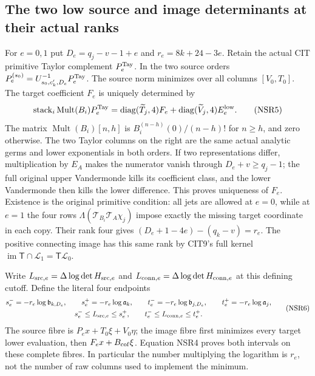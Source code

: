 \documentclass[11pt,a4paper]{article}
\begin{document}
\subsection{The two low source and image determinants at their actual ranks}
For $e=0,1$ put $D_e=q_j-v-1+e$ and
$r_e=8k+24-3e$. Retain the actual CIT primitive Taylor
complement $P_e^{\rm Tay}$. In the two source orders
$P_e^{(s_0)}=U_{s_0,c'_k,D_e}^{-1}P_e^{\rm Tay}$.
The source norm minimizes over all columns $[V_0,T_0]$.
The target coefficient $F_e$ is uniquely determined by
\[
 \operatorname{stack}_i\operatorname{Mult}(B_i)P_e^{\rm Tay}
  =\operatorname{diag}(\widetilde T_j,4)F_e
       +\operatorname{diag}(\widetilde V_j,4)E_e^{\rm low}.
 \tag{NSR5}
\]
The matrix $\operatorname{Mult}(B_i)[n,h]$ is
$B_i^{(n-h)}(0)/(n-h)!$ for $n\ge h$, and zero otherwise.
The two Taylor columns on the right are the same actual
analytic germs and lower exponentials in both orders.
If two representations differ, multiplication by $E_A$
makes the numerator vanish through $D_e+v\ge q_j-1$;
the full original upper Vandermonde kills its coefficient
class, and the lower Vandermonde then kills the lower
difference. This proves uniqueness of $F_e$.
Existence is the original primitive condition: all jets
are allowed at $e=0$, while at $e=1$ the four rows
$\Lambda(\mathcal T_{B_i}\mathcal T_A\chi_j)$ impose exactly
the missing target coordinate in each copy.
Their rank four gives
$(D_e+1-4e)-(q_k-v)=r_e$.
The positive connecting image has this same rank by
CIT9's full kernel
$\operatorname{im}\mathsf T\cap\mathcal L_1
=\mathsf T\mathcal L_0$.

Write $L_{{\rm src},e}=\Delta\log\det H_{{\rm src},e}$
and $L_{{\rm conn},e}=\Delta\log\det H_{{\rm conn},e}$
at this defining cutoff. Define the literal four endpoints
\[
 \begin{gathered}
 s_e^-=-r_e\log\mathfrak b_{k,D_e},\qquad
 s_e^+=-r_e\log\mathfrak a_k,\qquad
 t_e^-=-r_e\log\mathfrak b_{j,D_e},\qquad
 t_e^+=-r_e\log\mathfrak a_j,\\
 s_e^-\le L_{{\rm src},e}\le s_e^+,\qquad
 t_e^-\le L_{{\rm conn},e}\le t_e^+ .
 \end{gathered}\tag{NSR6}
\]
The source fibre is $P_ex+T_0\xi+V_0\eta$; the image fibre
first minimizes every target lower evaluation, then
$F_ex+B_{\rm cof}\xi$. Equation NSR4 proves both intervals
on these complete fibres. In particular the number
multiplying the logarithm is $r_e$, not the number of raw
columns used to implement the minimum.
\end{document}
